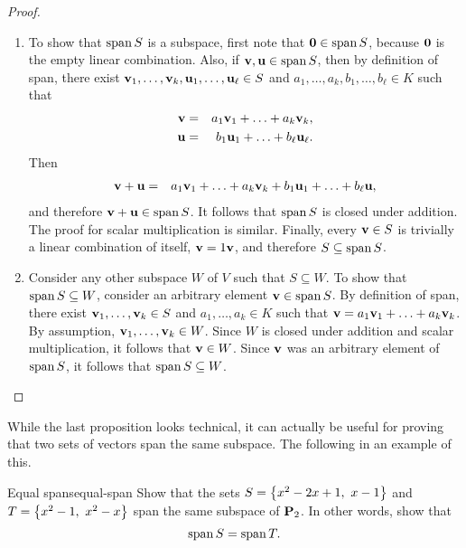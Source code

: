 \begin{proof}
  \begin{enumialphparenastyle}
    \begin{enumerate}
    \item To show that $\sspan S$ is a subspace, first note that
      $\vect{0}\in\sspan S$, because $\vect{0}$ is the empty linear
      combination. Also, if $\vect{v},\vect{u}\in\sspan S$, then by
      definition of span, there exist
      $\vect{v}_1,\ldots,\vect{v}_k,\vect{u}_1,\ldots,\vect{u}_{\ell}\in
      S$ and $a_1,\ldots,a_k,b_1,\ldots,b_{\ell}\in K$ such that
      \begin{eqnarray*}
        \vect{v} &=& a_1\vect{v}_1 + \ldots + a_k\vect{v}_k, \\
        \vect{u} &=& b_1\vect{u}_1 + \ldots + b_{\ell}\vect{u}_{\ell}.
      \end{eqnarray*}
      Then
      \begin{eqnarray*}
        \vect{v}+\vect{u}
        &=& a_1\vect{v}_1 + \ldots + a_k\vect{v}_k
            + b_1\vect{u}_1 + \ldots + b_{\ell}\vect{u},
      \end{eqnarray*}
      and therefore $\vect{v}+\vect{u}\in\sspan S$. It follows that
      $\sspan S$ is closed under addition. The proof for scalar
      multiplication is similar. Finally, every $\vect{v}\in S$ is
      trivially a linear combination of itself, $\vect{v}=1\vect{v}$,
      and therefore $S\subseteq \sspan S$.
    \item Consider any other subspace $W$ of $V$ such that
      $S\subseteq W$. To show that $\sspan S\subseteq W$, consider an
      arbitrary element $\vect{v}\in\sspan S$. By definition of span,
      there exist $\vect{v}_1,\ldots,\vect{v}_k\in S$ and
      $a_1,\ldots,a_k\in K$ such that
      $\vect{v}=a_1\vect{v}_1 + \ldots + a_k\vect{v}_k$. By
      assumption, $\vect{v}_1,\ldots,\vect{v}_k\in W$. Since $W$ is
      closed under addition and scalar multiplication, it follows that
      $\vect{v}\in W$. Since $\vect{v}$ was an arbitrary element of
      $\sspan S$, it follows that $\sspan S\subseteq W$.      
    \end{enumerate}
  \end{enumialphparenastyle}
\end{proof}

While the last proposition looks technical, it can actually be useful
for proving that two sets of vectors span the same subspace. The
following in an example of this.

\begin{example}{Equal spans}{equal-span}
  Show that the sets $S=\left\{x^2-2x+1,~ x-1\right\}$ and
  $T=\left\{x^2-1,~ x^2-x\right\}$ span the same subspace of $\mathbf{P}_2$. In other
  words, show that
  \begin{equation*}
    \sspan S = \sspan T.
  \end{equation*}
\end{example}

